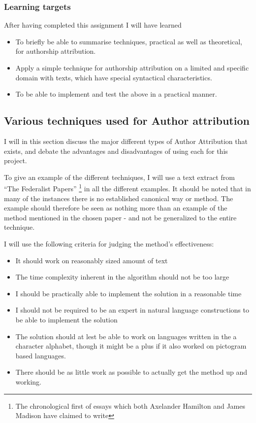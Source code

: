 \subsubsection{Learning targets}
After having completed this assignment I will have learned 
\begin{itemize}
\item To briefly be able to summarise techniques, practical as well as theoretical, for authorship attribution.
\item Apply a simple technique for authorship attribution on a limited and specific domain with texts, which have special syntactical characteristics.
\item To be able to implement and test the above in a practical manner.
\end{itemize}

\subsection{Various techniques used for Author attribution}
\label{techniques}
I will in this section discuss the major different types of Author Attribution that exists, and debate the advantages and disadvantages of using each for this project.

To give an example of the different techniques, I will use a text extract from ``The Federalist Papers'' \cite{federalist} \footnote{The chronological first of essays which both Axelander Hamilton and James Madison have claimed to write} in all the different examples. It should be noted that in many of the instances there is no established canonical way or method. The example should therefore be seen as nothing more than an example of the method mentioned in the chosen paper - and not be generalized to the entire technique.

I will use the following criteria for judging the method's effectiveness:
\begin{itemize}
\item It should work on reasonably sized amount of text
\item The time complexity inherent in the algorithm should not be too large
\item I should be practically able to implement the solution in a reasonable time
\item I should not be required to be an expert in natural language constructions to be able to implement the solution
\item The solution should at lest be able to work on languages written in the a character alphabet, though it might be a plus if it also worked on pictogram based languages.
\item There should be as little work as possible to actually get the method up and working.
\end{itemize}

